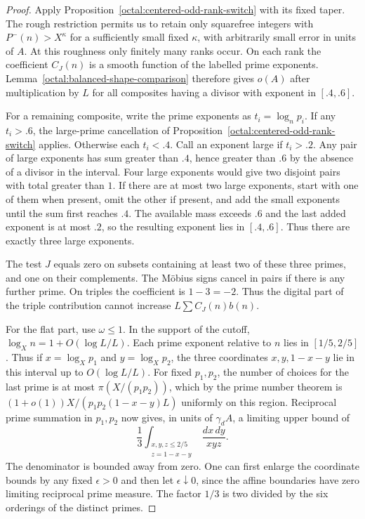\documentclass[11pt,a4paper]{article}
\theoremstyle{paperplain}
\numberwithin{equation}{section}
\begin{document}
\begin{proof}
Apply Proposition~\ref{octal:centered-odd-rank-switch} with its fixed
taper. The rough restriction permits us to retain only squarefree integers
with $P^-(n)>X^\kappa$ for a sufficiently small fixed $\kappa$, with
arbitrarily small error in units of $A$. At this roughness only finitely
many ranks occur. On each rank the coefficient $C_J(n)$ is a smooth
function of the labelled prime exponents. Lemma~\ref{octal:balanced-shape-comparison}
therefore gives $o(A)$ after multiplication by $L$ for all composites
having a divisor with exponent in $[.4,.6]$.

For a remaining composite, write the prime exponents as $t_i=\log_n p_i$.
If any $t_i>.6$, the large-prime cancellation of
Proposition~\ref{octal:centered-odd-rank-switch} applies. Otherwise each
$t_i<.4$. Call an exponent large if $t_i>.2$. Any pair of large exponents
has sum greater than $.4$, hence greater than $.6$ by the absence of a
divisor in the interval. Four large exponents would give two disjoint
pairs with total greater than $1$. If there are at most two large
exponents, start with one of them when present, omit the other if
present, and add the small exponents until the sum first reaches $.4$.
The available mass exceeds $.6$ and the last added exponent is at most
$.2$, so the resulting exponent lies in $[.4,.6]$. Thus there are
exactly three large exponents.

The test $J$ equals zero on subsets containing at least two of these
three primes, and one on their complements. The M\"obius signs cancel
in pairs if there is any further prime. On triples the coefficient
is $1-3=-2$. Thus the digital part of the triple contribution cannot
increase $L\sum C_J(n)b(n)$.

For the flat part, use $\omega\le1$. In the support of the cutoff,
$\log_X n=1+O(\log L/L)$. Each prime exponent relative to $n$ lies
in $[1/5,2/5]$. Thus if $x=\log_X p_1$ and $y=\log_X p_2$, the
three coordinates $x,y,1-x-y$ lie in this interval up to
$O(\log L/L)$. For fixed $p_1,p_2$, the number of choices for the last
prime is at most $\pi(X/(p_1p_2))$, which by the prime number theorem is
$(1+o(1))X/(p_1p_2(1-x-y)L)$ uniformly on this region. Reciprocal prime
summation in $p_1,p_2$ now gives, in units of $\gamma_d A$, a limiting
upper bound of
\[
 \frac13\int_{\substack{x,y,z\le 2/5\\z=1-x-y}}\frac{dx\,dy}{xyz}.
\]
The denominator is bounded away from zero. One can first enlarge
the coordinate bounds by any fixed $\epsilon>0$ and then let
$\epsilon\downarrow0$, since the affine boundaries have zero limiting
reciprocal prime measure. The factor $1/3$ is two divided by the six
orderings of the distinct primes.


\end{proof}
\end{document}

